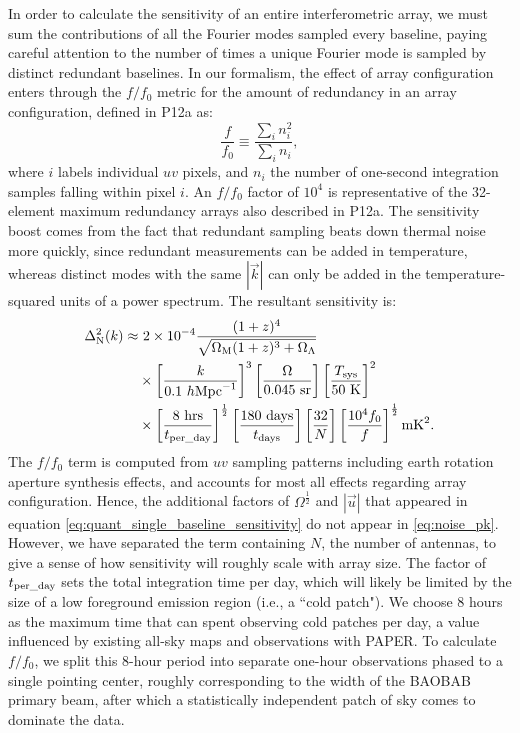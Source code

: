 \documentclass[10pt,iop]{emulateapj}
\begin{document}
In order to calculate the sensitivity of an entire interferometric array, we must sum
the contributions of all the Fourier modes sampled every baseline, 
paying careful attention to the number of times a unique Fourier mode is sampled by distinct
redundant baselines. 
In our formalism, the effect of array configuration enters through the $f/f_0$ metric 
for the amount of redundancy in an array configuration, defined in 
P12a as:
\begin{equation}
\frac{f}{f_0} \equiv \frac{\sum\limits_i n_i^2}{\sum\limits_i n_i},
\end{equation}
where $i$ labels individual $uv$ pixels, and $n_i$ the number of one-second integration samples
falling within pixel $i$.
An $f/f_0$ factor of $10^4$ is representative of the 32-element maximum redundancy
arrays also described in P12a.
The sensitivity boost comes from the fact that 
redundant sampling beats down thermal noise more quickly, since redundant
measurements can be added in temperature, whereas distinct modes with the same $|\vec{k}|$ 
can only be added in the temperature-squared units of a power
spectrum.  The resultant sensitivity is:
\begin{align}
\label{eq:noise_pk}
    \Delta^2_{\rm N}(k)\approx &~2 \times 10^{-4}
    \frac{(1+z)^4}{\sqrt{\Omega_{\rm M}(1+z)^3+\Omega_\Lambda}}
    \nonumber\\&\times    
    \left[\frac{k}{0.1\ h\rm{Mpc}^{-1}}\right]^3
    \left[\frac{\Omega}{0.045\ {\rm sr}}\right]
    \left[\frac{T_{\rm sys}}{50\ {\rm K}}\right]^2
    \nonumber\\&\times    
    \left[\frac{8\ {\rm hrs}}{t_{\rm per\_day}}\right]^\frac12
    \left[\frac{180\ {\rm days}}{t_{\rm days}}\right]
    \left[\frac{32}{N}\right]
    \left[\frac{10^4 f_0}{f}\right]^\frac12
    {\rm mK}^2.
\end{align}
The $f/f_0$ term is computed from $uv$ sampling patterns including earth
rotation aperture synthesis effects, and accounts for most
all effects regarding array configuration.  Hence, the additional factors of $\Omega^\frac12$
and $|\vec{u}|$ that appeared in equation \ref{eq:quant_single_baseline_sensitivity} do not
appear in \ref{eq:noise_pk}.  However, we have separated the term containing $N$, the number
of antennas, to give a sense of how sensitivity will roughly scale with array size.
The factor of $t_{\rm per\_day}$ sets the total integration time per day, which will likely
be limited by the size of a low foreground emission region (i.e., a ``cold patch").  We choose
8 hours as the maximum time that can spent observing cold patches per day, a value influenced
by existing all-sky maps and observations with PAPER.
To calculate $f/f_0$,
we split this 8-hour period into separate one-hour observations phased to a single pointing center,
roughly corresponding to the width of the BAOBAB primary beam, after which 
a statistically independent patch of sky comes to dominate the data.
\end{document}
